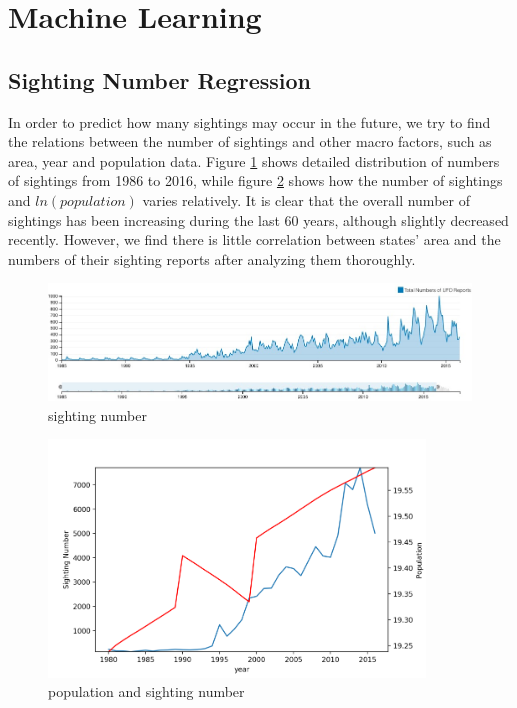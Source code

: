 \section{Machine Learning}\label{ml}
\subsection{Sighting Number Regression}
In order to predict how many sightings may occur in the future, we try to find the relations between the number of sightings and other macro factors, such as area, year and population data. Figure \ref{year} shows detailed distribution of numbers of sightings from 1986 to 2016, while figure \ref{regression} shows how the number of sightings and $ln(population)$ varies relatively. It is clear that the overall number of sightings has been increasing during the last 60 years, although slightly decreased recently. However, we find there is little correlation between states' area and the numbers of their sighting reports after analyzing them thoroughly.
\begin{figure}[H]
    \centering
    \includegraphics[width=17cm]{figure/year.jpg}
    \caption{sighting number}
    \label{year}
\end{figure}

\begin{figure}[H]
    \centering
    \includegraphics[width=10cm]{figure/regression.png}
    \caption{population and sighting number}
    \label{regression}
\end{figure}

